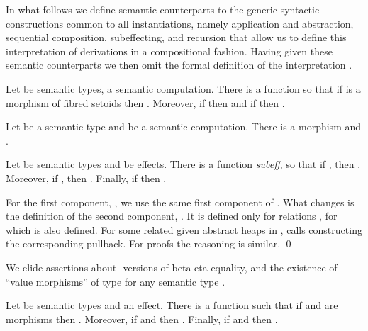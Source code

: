 \documentclass[orivec]{llncs}
\renewenvironment{proof}{\vspace{-1mm} \noindent {\bf Proof}\quad}{\qed}
\begin{document}
In what follows we define semantic counterparts to the generic
syntactic constructions common to all instantiations, namely
application and abstraction, sequential composition, subeffecting, and
recursion
that allow us to define this interpretation of derivations in a
compositional fashion. Having given these semantic counterparts we
then omit the formal definition of the interpretation .
\begin{lemma}[Abstraction]
Let  be  semantic types,  a semantic computation. There is a function  so that if  is a morphism of fibred setoids then . Moreover, if  then  and if  then . 
\end{lemma}
\begin{lemma}[Application]
Let  be a semantic type and  be a semantic computation. There  is a
morphism  and
.  
\end{lemma}

\begin{lemma}[subeffecting]
 Let  be semantic types and  be effects. There is
a function \emph{subeff}, so that if , then 
. Moreover, if , then . Finally, if  then .
\end{lemma}

\begin{proof}
For the first component, , we use the same first component
 of  . What changes is the definition of the second
component, . It is defined only for relations , for which  is also defined. For some related
given abstract heaps in ,  calls  constructing the
corresponding pullback. For proofs the reasoning is similar.
\end{proof}


We elide assertions about -versions of beta-eta-equality, and
the existence of ``value morphisms'' of type
 for any semantic type . 


\begin{lemma}[let]
Let  be semantic types and  an effect. 
There is a function  such that if  and  are morphisms
then . Moreover, if
 and  then . 
Finally, if  and
 then . 
\end{lemma}
\end{document}
